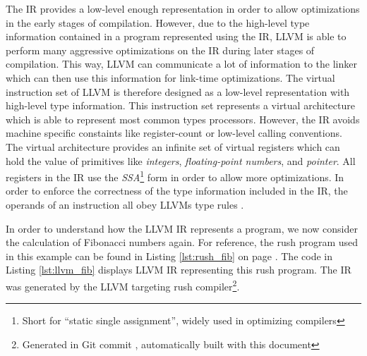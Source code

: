 The IR provides a low-level enough representation in order to allow optimizations in the early stages of compilation.
However, due to the high-level type information contained in a program represented using the IR,
LLVM is able to perform many aggressive optimizations on the IR during later stages of compilation.
This way, LLVM can communicate a lot of information to the linker which can then use this information for link-time optimizations.
The virtual instruction set of LLVM is therefore designed as a low-level representation with high-level type information.
This instruction set represents a virtual architecture which is able to represent most common types processors.
However, the IR avoids machine specific constaints like register-count or low-level calling conventions.
The virtual architecture provides an infinite set of virtual registers which can hold the value of primitives like \emph{integers}, \emph{floating-point numbers}, and \emph{pointer}.
All registers in the IR use the \emph{SSA}\footnote{Short for \enquote{static single assignment}, widely used in optimizing compilers} form in order to allow more optimizations.
In order to enforce the correctness of the type information included in the IR,
the operands of an instruction all obey LLVMs type rules \cite[p.~14-17]{Lattner:MSThesis02}.



In order to understand how the LLVM IR represents a program, we now consider the calculation of Fibonacci numbers again.
For reference, the rush program used in this example can be found in Listing \ref{lst:rush_fib} on page \pageref{lst:rush_fib}.
The code in Listing \ref{lst:llvm_fib} displays LLVM IR representing this rush program.
The IR was generated by the LLVM targeting rush compiler\footnote{Generated in Git commit \rushCommit, automatically built with this document}.

